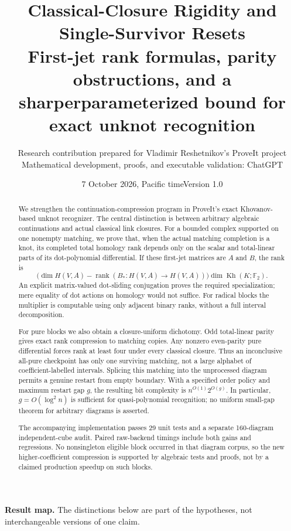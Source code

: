 \documentclass[11pt]{article}
\title{\textbf{Classical-Closure Rigidity and Single-Survivor Resets}\\[5pt]
\large First-jet rank formulas, parity obstructions, and a sharper\newline parameterized bound for exact unknot recognition}
\author{Research contribution prepared for Vladimir Reshetnikov's ProveIt project\\[3pt]
\small Mathematical development, proofs, and executable validation: ChatGPT}
\date{7 October 2026, Pacific time\quad Version 1.0}
\theoremstyle{definition}\newtheorem{definition}[theorem]{Definition}\newtheorem{example}[theorem]{Example}
\theoremstyle{remark}\newtheorem{remark}[theorem]{Remark}
\newcommand{\F}{{\mathbb{F}_2}}
\newcommand{\rk}{\operatorname{rank}}
\newcommand{\Kh}{\operatorname{Kh}}
\begin{document}
\maketitle
\begin{abstract}
We strengthen the continuation-compression program in ProveIt's exact Khovanov-based unknot recognizer. The central distinction is between arbitrary algebraic continuations and actual classical link closures. For a bounded complex supported on one nonempty matching, we prove that, when the actual matching completion is a knot, its completed total homology rank depends only on the scalar and total-linear parts of its dot-polynomial differential. If these first-jet matrices are $A$ and $B$, the rank is
\[
 \bigl(\dim H(V,A)-\rk(B_*:H(V,A)\to H(V,A))\bigr)\dim\Kh(K;\F).
\]
An explicit matrix-valued dot-sliding conjugation proves the required specialization; mere equality of dot actions on homology would not suffice. For radical blocks the multiplier is computable using only adjacent binary ranks, without a full interval decomposition.

For pure blocks we also obtain a closure-uniform dichotomy. Odd total-linear parity gives exact rank compression to matching copies. Any nonzero even-parity pure differential forces rank at least four under every classical closure. Thus an inconclusive all-pure checkpoint has only one surviving matching, not a large alphabet of coefficient-labelled intervals. Splicing this matching into the unprocessed diagram permits a genuine restart from empty boundary. With a specified order policy and maximum restart gap $g$, the resulting bit complexity is $n^{O(1)}2^{O(g)}$. In particular, $g=O(\log^2 n)$ is sufficient for quasi-polynomial recognition; no uniform small-gap theorem for arbitrary diagrams is asserted.

The accompanying implementation passes 29 unit tests and a separate 160-diagram independent-cube audit. Paired raw-backend timings include both gains and regressions. No nonsingleton eligible block occurred in that diagram corpus, so the new higher-coefficient compression is supported by algebraic tests and proofs, not by a claimed production speedup on such blocks.
\end{abstract}
\newpage
\setcounter{tocdepth}{1}
\tableofcontents
\bigskip
\noindent\textbf{Result map.} The distinctions below are part of the hypotheses, not interchangeable versions of one claim.
\end{document}
